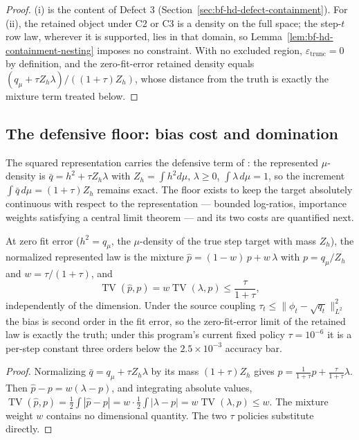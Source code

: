 \begin{proof}
(i) is the content of Defect 3
(Section~\ref{sec:bf-hd-defect-containment}).  For (ii), the retained
object under C2 or C3 is a density on the full space; the step-\(t\) row
law, wherever it is supported, lies in that domain, so
Lemma~\ref{lem:bf-hd-containment-nesting} imposes no constraint.  With
no excluded region, \(\varepsilon_{\mathrm{trunc}}=0\) by definition,
and the zero-fit-error retained density equals
\((q_\mu+\tau Z_h\lambda)/((1+\tau)Z_h)\), whose distance from the truth
is exactly the mixture term treated below.
\end{proof}

\subsection{The defensive floor: bias cost and domination}

The squared representation carries the defensive term of
\citet[eq.~(13), eq.~(16)]{zhao2024ttsequential}: the represented
\(\mu\)-density is \(\bar q=h^2+\tau Z_h\lambda\) with
\(Z_h=\int h^2 d\mu\), \(\lambda\ge0\), \(\int\lambda\,d\mu=1\), so the
increment \(\int\bar q\,d\mu=(1+\tau)Z_h\) remains exact.  The floor
exists to keep the target absolutely continuous with respect to the
representation --- bounded log-ratios, importance weights satisfying a
central limit theorem --- and its two costs are quantified next.

\begin{proposition}
\label{prop:bf-hd-defensive-mixture-bias}
At zero fit error (\(h^2=q_\mu\), the \(\mu\)-density of the true step
target with mass \(Z_h\)), the normalized represented law is the mixture
\(\hat p=(1-w)\,p+w\,\lambda\) with \(p=q_\mu/Z_h\) and
\(w=\tau/(1+\tau)\), and
\[
  \operatorname{TV}(\hat p,p)=w\operatorname{TV}(\lambda,p)\le
  \frac{\tau}{1+\tau},
\]
independently of the dimension.  Under the source coupling
\(\tau_t\le\lVert\phi_t-\sqrt{q_t}\rVert_{L^2}^2\)
\citep[Lemma~1 and Proposition~11]{zhao2024ttsequential} the bias is
second order in the fit error, so the zero-fit-error limit of the
retained law is exactly the truth; under this program's current fixed
policy \(\tau=10^{-6}\) it is a per-step constant three orders below the
\(2.5\times10^{-3}\) accuracy bar.
\end{proposition}

\begin{proof}
Normalizing \(\bar q=q_\mu+\tau Z_h\lambda\) by its mass
\((1+\tau)Z_h\) gives
\(\hat p=\frac{1}{1+\tau}p+\frac{\tau}{1+\tau}\lambda\).  Then
\(\hat p-p=w(\lambda-p)\), and integrating absolute values,
\(\operatorname{TV}(\hat p,p)=\tfrac12\int|\hat p-p|
 =w\cdot\tfrac12\int|\lambda-p|=w\operatorname{TV}(\lambda,p)\le w\).
The mixture weight \(w\) contains no dimensional quantity.  The two
\(\tau\) policies substitute directly.
\end{proof}

